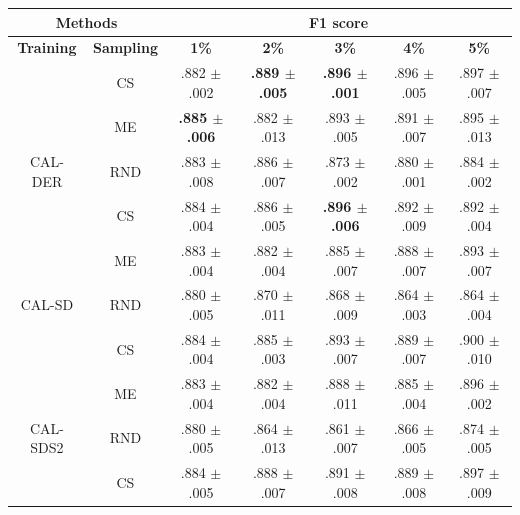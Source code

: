 \begin{table}[htbp]
\centering

\begin{tabular*}{\linewidth}{c|c|@{\extracolsep{\fill}}ccccc}
\toprule
\multicolumn{2}{c|}{\textbf{Methods}} & \multicolumn{5}{c}{\textbf{F1 score}} \\
\midrule
\textbf{Training} & \textbf{Sampling} & \textbf{1\%} & \textbf{2\%} & \textbf{3\%} & \textbf{4\%} & \textbf{5\%}\\
\midrule
 & CS & .882 $\pm$ {\small .002} & \textbf{.889 $\pm$ {\small .005}} & \textbf{.896 $\pm$ {\small .001}} & .896 $\pm$ {\small .005} & .897 $\pm$ {\small .007}\\

 & ME & \textbf{.885 $\pm$ {\small .006}} & .882 $\pm$ {\small .013} & .893 $\pm$ {\small .005} & .891 $\pm$ {\small .007} & .895 $\pm$ {\small .013}\\

\multirow{-3}{*}{\raggedright\arraybackslash CAL-DER} & RND & .883 $\pm$ {\small .008} & .886 $\pm$ {\small .007} & .873 $\pm$ {\small .002} & .880 $\pm$ {\small .001} & .884 $\pm$ {\small .002}\\
\midrule
 & CS & .884 $\pm$ {\small .004} & .886 $\pm$ {\small .005} & \textbf{.896 $\pm$ {\small .006}} & .892 $\pm$ {\small .009} & .892 $\pm$ {\small .004}\\

 & ME & .883 $\pm$ {\small .004} & .882 $\pm$ {\small .004} & .885 $\pm$ {\small .007} & .888 $\pm$ {\small .007} & .893 $\pm$ {\small .007}\\

\multirow{-3}{*}{\raggedright\arraybackslash CAL-SD} & RND & .880 $\pm$ {\small .005} & .870 $\pm$ {\small .011} & .868 $\pm$ {\small .009} & .864 $\pm$ {\small .003} & .864 $\pm$ {\small .004}\\
\midrule
 & CS & .884 $\pm$ {\small .004} & .885 $\pm$ {\small .003} & .893 $\pm$ {\small .007} & .889 $\pm$ {\small .007} & .900 $\pm$ {\small .010}\\

 & ME & .883 $\pm$ {\small .004} & .882 $\pm$ {\small .004} & .888 $\pm$ {\small .011} & .885 $\pm$ {\small .004} & .896 $\pm$ {\small .002}\\

\multirow{-3}{*}{\raggedright\arraybackslash CAL-SDS2} & RND & .880 $\pm$ {\small .005} & .864 $\pm$ {\small .013} & .861 $\pm$ {\small .007} & .866 $\pm$ {\small .005} & .874 $\pm$ {\small .005}\\
\midrule
 & CS & .884 $\pm$ {\small .005} & .888 $\pm$ {\small .007} & .891 $\pm$ {\small .008} & .889 $\pm$ {\small .008} & .897 $\pm$ {\small .009}\\


\end{tabular*}
\end{table}
